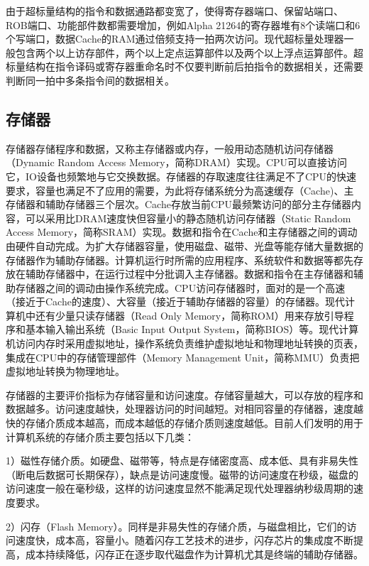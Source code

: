 \documentclass[]{ctexbook}
\begin{document}
由于超标量结构的指令和数据通路都变宽了，使得寄存器端口、保留站端口、ROB端口、功能部件数都需要增加，例如Alpha 21264的寄存器堆有8个读端口和6个写端口，数据Cache的RAM通过倍频支持一拍两次访问。现代超标量处理器一般包含两个以上访存部件，两个以上定点运算部件以及两个以上浮点运算部件。超标量结构在指令译码或寄存器重命名时不仅要判断前后拍指令的数据相关，还需要判断同一拍中多条指令间的数据相关。

\hypertarget{ux5b58ux50a8ux5668}{%
\subsection{存储器}\label{ux5b58ux50a8ux5668}}

存储器存储程序和数据，又称主存储器或内存，一般用动态随机访问存储器（Dynamic Random Access Memory，简称DRAM）实现。CPU可以直接访问它，IO设备也频繁地与它交换数据。存储器的存取速度往往满足不了CPU的快速要求，容量也满足不了应用的需要，为此将存储系统分为高速缓存（Cache)、主存储器和辅助存储器三个层次。Cache存放当前CPU最频繁访问的部分主存储器内容，可以采用比DRAM速度快但容量小的静态随机访问存储器（Static Random Access Memory，简称SRAM）实现。数据和指令在Cache和主存储器之间的调动由硬件自动完成。为扩大存储器容量，使用磁盘、磁带、光盘等能存储大量数据的存储器作为辅助存储器。计算机运行时所需的应用程序、系统软件和数据等都先存放在辅助存储器中，在运行过程中分批调入主存储器。数据和指令在主存储器和辅助存储器之间的调动由操作系统完成。CPU访问存储器时，面对的是一个高速（接近于Cache的速度）、大容量（接近于辅助存储器的容量）的存储器。现代计算机中还有少量只读存储器（Read Only Memory，简称ROM）用来存放引导程序和基本输入输出系统（Basic Input Output System，简称BIOS）等。现代计算机访问内存时采用虚拟地址，操作系统负责维护虚拟地址和物理地址转换的页表，集成在CPU中的存储管理部件（Memory Management Unit，简称MMU）负责把虚拟地址转换为物理地址。

存储器的主要评价指标为存储容量和访问速度。存储容量越大，可以存放的程序和数据越多。访问速度越快，处理器访问的时间越短。对相同容量的存储器，速度越快的存储介质成本越高，而成本越低的存储介质则速度越低。目前人们发明的用于计算机系统的存储介质主要包括以下几类：

1）磁性存储介质。如硬盘、磁带等，特点是存储密度高、成本低、具有非易失性（断电后数据可长期保存），缺点是访问速度慢。磁带的访问速度在秒级，磁盘的访问速度一般在毫秒级，这样的访问速度显然不能满足现代处理器纳秒级周期的速度要求。

2）闪存（Flash Memory）。同样是非易失性的存储介质，与磁盘相比，它们的访问速度快，成本高，容量小。随着闪存工艺技术的进步，闪存芯片的集成度不断提高，成本持续降低，闪存正在逐步取代磁盘作为计算机尤其是终端的辅助存储器。
\end{document}

